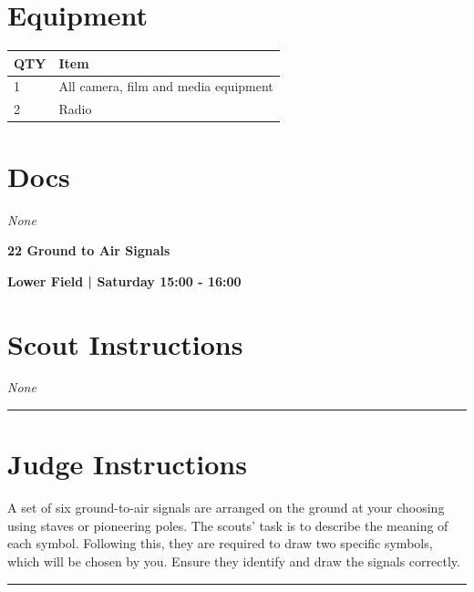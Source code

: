 \documentclass[10pt]{article}
\newcommand{\newtitle}[1]{\begin{center}{\Huge\bfseries #1 }\\ \vspace{5mm}\end{center}}
\newcommand{\newsubtitle}[1]{\begin{center}{\color{grey}\Large\bfseries #1 }\\ \vspace{5mm}\end{center}}
\begin{document}
	\begin{multicols}{2}

		\section*{\faWrench \: Equipment}

		
	\begin{center}
			\begin{tabular}{p{2cm}p{4cm}}


				\textbf{QTY} & \textbf{Item} \\\toprule
												1&All camera, film and media equipment\\\midrule
												2&Radio\\\midrule
								\end{tabular}

			\end{center}

		
		\vfill\null
		\columnbreak

			\section*{\faFile \: Docs}
		 	\textit{None}
	

		\vfill\null

		\end{multicols}



	\vspace{1cm}


	\clearpage
		\newtitle{22 Ground to Air Signals }
	\newsubtitle{Lower Field | Saturday 15:00 - 16:00}
		\setcounter{section}{21}
	\section*{Scout Instructions}
		\textit{None}
	
	\vspace{0.5cm}
	\hrule
	\vspace{0.5cm}

		\section*{Judge Instructions}
		A set of six ground-to-air signals are arranged on the ground at your choosing using staves or pioneering poles. The scouts' task is to describe the meaning of each symbol. Following this, they are required to draw two specific symbols, which will be chosen by you. Ensure they identify and draw the signals correctly.
\vspace{0.5cm}
	\hrule
	\vspace{0.5cm}
\end{document}
